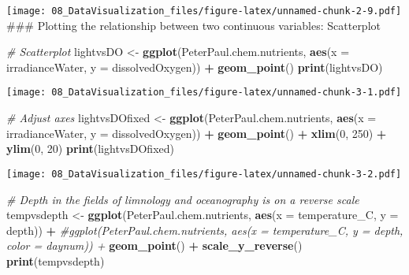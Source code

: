 \documentclass[
]{article}
\newenvironment{Shaded}{\begin{snugshade}}{\end{snugshade}}
\newcommand{\CommentTok}[1]{\textcolor[rgb]{0.56,0.35,0.01}{\textit{#1}}}
\newcommand{\DataTypeTok}[1]{\textcolor[rgb]{0.13,0.29,0.53}{#1}}
\newcommand{\DecValTok}[1]{\textcolor[rgb]{0.00,0.00,0.81}{#1}}
\newcommand{\KeywordTok}[1]{\textcolor[rgb]{0.13,0.29,0.53}{\textbf{#1}}}
\newcommand{\NormalTok}[1]{#1}
\newcommand{\OperatorTok}[1]{\textcolor[rgb]{0.81,0.36,0.00}{\textbf{#1}}}
\newcommand{\StringTok}[1]{\textcolor[rgb]{0.31,0.60,0.02}{#1}}
\begin{document}
\texttt{[image: 08\_DataVisualization\_files/figure-latex/unnamed-chunk-2-9.pdf]}
\#\#\# Plotting the relationship between two continuous variables:
Scatterplot

\begin{Shaded}
\begin{Highlighting}[]
\CommentTok{# Scatterplot}
\NormalTok{lightvsDO <-}\StringTok{ }
\StringTok{  }\KeywordTok{ggplot}\NormalTok{(PeterPaul.chem.nutrients, }\KeywordTok{aes}\NormalTok{(}\DataTypeTok{x =}\NormalTok{ irradianceWater, }\DataTypeTok{y =}\NormalTok{ dissolvedOxygen)) }\OperatorTok{+}
\StringTok{  }\KeywordTok{geom_point}\NormalTok{()}
\KeywordTok{print}\NormalTok{(lightvsDO)}
\end{Highlighting}
\end{Shaded}

\texttt{[image: 08\_DataVisualization\_files/figure-latex/unnamed-chunk-3-1.pdf]}

\begin{Shaded}
\begin{Highlighting}[]
\CommentTok{# Adjust axes}
\NormalTok{lightvsDOfixed <-}\StringTok{ }
\StringTok{  }\KeywordTok{ggplot}\NormalTok{(PeterPaul.chem.nutrients, }\KeywordTok{aes}\NormalTok{(}\DataTypeTok{x =}\NormalTok{ irradianceWater, }\DataTypeTok{y =}\NormalTok{ dissolvedOxygen)) }\OperatorTok{+}
\StringTok{  }\KeywordTok{geom_point}\NormalTok{() }\OperatorTok{+}
\StringTok{  }\KeywordTok{xlim}\NormalTok{(}\DecValTok{0}\NormalTok{, }\DecValTok{250}\NormalTok{) }\OperatorTok{+}
\StringTok{  }\KeywordTok{ylim}\NormalTok{(}\DecValTok{0}\NormalTok{, }\DecValTok{20}\NormalTok{)}
\KeywordTok{print}\NormalTok{(lightvsDOfixed)}
\end{Highlighting}
\end{Shaded}

\texttt{[image: 08\_DataVisualization\_files/figure-latex/unnamed-chunk-3-2.pdf]}

\begin{Shaded}
\begin{Highlighting}[]
\CommentTok{# Depth in the fields of limnology and oceanography is on a reverse scale}
\NormalTok{tempvsdepth <-}\StringTok{ }
\StringTok{  }\KeywordTok{ggplot}\NormalTok{(PeterPaul.chem.nutrients, }\KeywordTok{aes}\NormalTok{(}\DataTypeTok{x =}\NormalTok{ temperature_C, }\DataTypeTok{y =}\NormalTok{ depth)) }\OperatorTok{+}
\StringTok{  }\CommentTok{#ggplot(PeterPaul.chem.nutrients, aes(x = temperature_C, y = depth, color = daynum)) +}
\StringTok{  }\KeywordTok{geom_point}\NormalTok{() }\OperatorTok{+}
\StringTok{  }\KeywordTok{scale_y_reverse}\NormalTok{()}
\KeywordTok{print}\NormalTok{(tempvsdepth)}
\end{Highlighting}
\end{Shaded}
\end{document}
